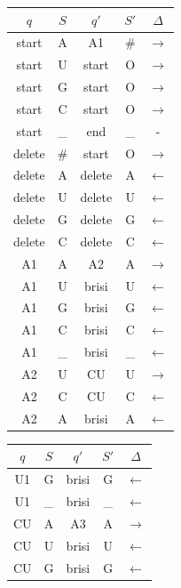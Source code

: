 \documentclass{article}
\begin{document}
\begin{center}
    \begin{tabular}{| c | c || c | c | c |}
        \hline
        $q$ & $S$ & $q'$ & $S'$ & $\Delta$   \\  \hline
        start & A & A1 & \# & $\rightarrow$  \\ \hline
        start & U & start & O & $\rightarrow$  \\ \hline
        start & G & start & O & $\rightarrow$  \\ \hline
        start & C & start & O & $\rightarrow$  \\ \hline
        start & \_ & end & \_ & -  \\ \hline
        delete & \# & start & O & $\rightarrow$  \\ \hline
        delete & A & delete & A & $\leftarrow$  \\ \hline
        delete & U & delete & U & $\leftarrow$  \\ \hline
        delete & G & delete & G & $\leftarrow$  \\ \hline
        delete & C & delete & C & $\leftarrow$  \\ \hline
        A1 & A & A2 & A & $\rightarrow$  \\ \hline
        A1 & U & brisi & U & $\leftarrow$  \\ \hline
        A1 & G & brisi & G & $\leftarrow$  \\ \hline
        A1 & C & brisi & C & $\leftarrow$  \\ \hline
        A1 & \_ & brisi & \_ & $\leftarrow$  \\ \hline
        A2 & U & CU & U & $\rightarrow$  \\ \hline
        A2 & C & CU & C & $\leftarrow$  \\ \hline
        A2 & A & brisi & A & $\leftarrow$  \\ \hline
    \end{tabular}
    \quad
    \begin{tabular}{| c | c || c | c | c |}
        \hline
        $q$ & $S$ & $q'$ & $S'$ & $\Delta$   \\  \hline
        U1 & G & brisi & G & $\leftarrow$  \\ \hline
        U1 & \_ & brisi & \_ & $\leftarrow$  \\ \hline
        CU & A & A3 & A & $\rightarrow$  \\ \hline
        CU & U & brisi & U & $\leftarrow$  \\ \hline
        CU & G & brisi & G & $\leftarrow$  \\ \hline

\end{tabular}
\end{center}
\end{document}
